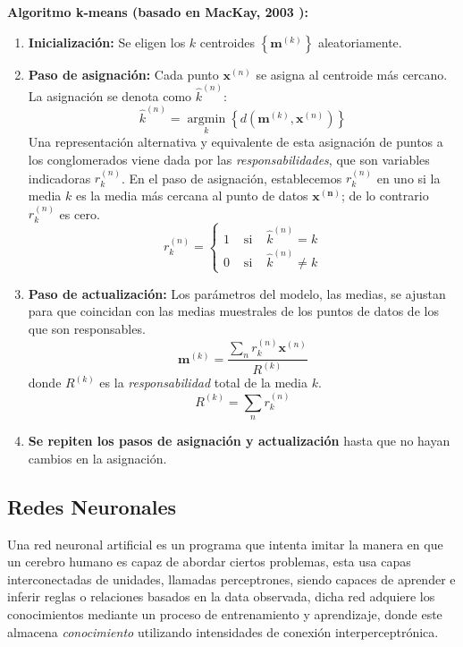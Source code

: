 \documentclass[12pt,letterpaper,oneside,openright]{book}
\begin{document}
	\textbf{Algoritmo k-means (basado en MacKay, 2003 \cite{mackay03}):}
	\begin{enumerate}
		\item \textbf{Inicialización:} 
		Se eligen los $k$ centroides $\left\{\mathbf{m}^{(k)}\right\}$ aleatoriamente.
		\item \textbf{Paso de asignación:}
		Cada punto $\mathbf{x}^{(n)}$ se asigna al centroide más cercano. La asignación se denota como $\hat{k}^{(n)}$:
		\begin{equation}
			\label{eq:k_mean_asig}
			\hat{k}^{(n)}=\underset{k}{\operatorname{argmin}}\left\{d\left(\mathbf{m}^{(k)}, \mathbf{x}^{(n)}\right)\right\}
		\end{equation}
		Una representación alternativa y equivalente de esta asignación de puntos a los conglomerados viene dada por las \textit{responsabilidades}, que son variables indicadoras $r_k^{(n)}$. En el paso de asignación, establecemos $r_k^{(n)}$ en uno si la media $k$ es la media más cercana al punto de datos $\mathbf{x^{(n)}}$; de lo contrario $r_k^{(n)}$ es cero.
		\begin{equation}
			\label{eq:cond_rk}
			r_k^{(n)}=\left\{\begin{array}{lll}
				1 & \text { si } & \hat{k}^{(n)}=k \\
				0 & \text { si } & \hat{k}^{(n)} \neq k
			\end{array}\right.
		\end{equation}
		\item \textbf{Paso de actualización:}
		Los parámetros del modelo, las medias, se ajustan para que coincidan con las medias muestrales de los puntos de datos de los que son responsables.
		\begin{equation}
			\label{eq:media_muestral}
			\mathbf{m}^{(k)}=\frac{\sum_n r_k^{(n)} \mathbf{x}^{(n)}}{R^{(k)}}
		\end{equation}
		donde $R^{(k)}$ es la \textit{responsabilidad} total de la media $k$.
		\begin{equation}
			\label{eq:rk}
			R^{(k)}=\sum_n r_k^{(n)}
		\end{equation}
		\item \textbf{Se repiten los pasos de asignación y actualización} hasta que no hayan cambios en la asignación.
	\end{enumerate}
	
\subsection{Redes Neuronales}
	Una red neuronal artificial es un programa que intenta imitar la manera en que un cerebro humano es capaz de abordar ciertos problemas, esta usa capas interconectadas de unidades, llamadas perceptrones, siendo capaces de aprender e inferir reglas o relaciones basados en la data observada, dicha red adquiere los conocimientos mediante un proceso de entrenamiento y aprendizaje, donde este almacena \textit{conocimiento} utilizando intensidades de conexión interperceptrónica. 
\end{document}
